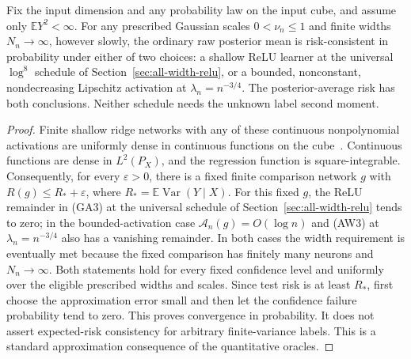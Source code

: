 \begin{corollary}
\label{cor:gaussian-universal-consistency}
Fix the input dimension and any probability law on the input cube,
and assume only $\mathbb E Y^2<\infty$. For any prescribed Gaussian scales $0<\nu_n\le1$ and finite widths
$N_n\to\infty$, however slowly, the ordinary raw posterior mean is
risk-consistent in probability under either of two choices: a shallow
ReLU learner at the universal $\log^8$ schedule of
Section~\ref{sec:all-width-relu}, or a bounded, nonconstant,
nondecreasing Lipschitz activation at $\lambda_n=n^{-3/4}$.
The posterior-average risk has both conclusions. Neither schedule
needs the unknown label second moment.
\end{corollary}
\begin{proof}
Finite shallow ridge networks with any of these continuous
nonpolynomial activations are uniformly dense in continuous functions
on the cube~\cite[Theorem~1]{leshno}. Continuous functions are dense in
$L^2(P_X)$, and the regression function is square-integrable.
Consequently, for every $\varepsilon>0$, there is a fixed finite
comparison network $g$ with
$R(g)\le R_*+\varepsilon$, where
$R_*=\mathbb E\operatorname{Var}(Y\mid X)$.
For this fixed $g$, the ReLU remainder in (GA3) at the universal
schedule of Section~\ref{sec:all-width-relu} tends to zero;
in the bounded-activation case $\mathcal A_n(g)=O(\log n)$ and (AW3)
at $\lambda_n=n^{-3/4}$ also has a vanishing remainder. In both cases the
width requirement is eventually met because the fixed comparison
has finitely many neurons and $N_n\to\infty$.
Both statements hold for every fixed confidence level and uniformly
over the eligible prescribed widths and scales. Since test risk is
at least $R_*$, first choose the approximation error small and then
let the confidence failure probability tend to zero. This proves
convergence in probability. It does not assert expected-risk
consistency for arbitrary finite-variance labels. This is a standard
approximation consequence of the quantitative oracles.
\end{proof}
